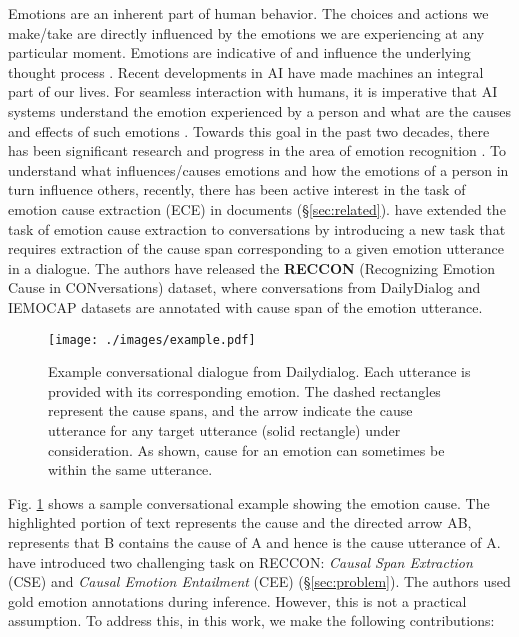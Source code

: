 \documentclass{article}
\begin{document}
Emotions are an inherent part of human behavior. The choices and actions we make/take are directly influenced by the emotions we are experiencing at any particular moment. Emotions are indicative of and influence the underlying thought process \citep{minsky2007emotion}. Recent developments in AI have made machines an integral part of our lives. For seamless interaction with humans, it is imperative that AI systems understand the emotion experienced by a person and what are the causes and effects of such emotions \cite{singh-etal-2021-end}. Towards this goal in the past two decades, there has been significant research and progress in the area of emotion recognition \cite{9330790}. To understand what influences/causes emotions and how the emotions of a person in turn influence others, recently, there has been active interest in the task of emotion cause extraction (ECE) in documents (\S \ref{sec:related}). \citet{poria2020recognizing} have extended the task of emotion cause extraction to conversations by introducing a new task that requires extraction of the cause span corresponding to a given emotion utterance in a dialogue. The authors have released the \textbf{RECCON} (Recognizing Emotion Cause in CONversations) dataset, where conversations from DailyDialog \cite{li-etal-2017-dailydialog} and IEMOCAP \cite{busso2008iemocap} datasets are annotated with cause span of the emotion utterance. 
\begin{figure}[t]
\centering
\texttt{[image: ./images/example.pdf]}
\caption{Example conversational dialogue from Dailydialog. Each utterance is provided with its corresponding emotion. The dashed rectangles represent the cause spans, and the arrow indicate the cause utterance for any target utterance (solid rectangle) under consideration. As shown, cause for an emotion can sometimes be within the same utterance.}
\label{fig:example}
\vspace{-6mm}
\end{figure}
Fig. \ref{fig:example} shows a sample conversational example showing the emotion cause. The highlighted portion of text represents the cause and the directed arrow AB, represents that B contains the cause of A and hence is the cause utterance of A. \citet{poria2020recognizing} have introduced two challenging task on RECCON: \textit{Causal Span Extraction} (CSE) and \textit{Causal Emotion Entailment} (CEE) (\S \ref{sec:problem}). The authors used gold emotion annotations during inference. However, this is not a practical assumption. To address this, in this work, we make the following contributions: 
\end{document}
